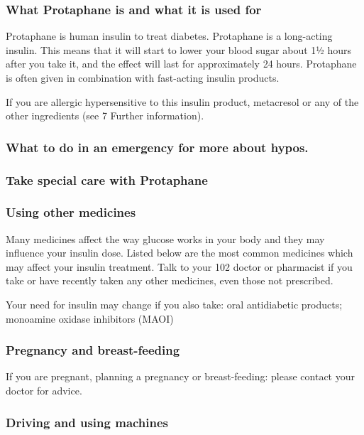 \documentclass[output=paper]{langsci/langscibook}
\begin{document}
\subsubsection*{What Protaphane is and what it is used for}

Protaphane is human insulin to treat diabetes. Protaphane is a long-acting insulin. This means that it will start to lower your blood sugar about 1½ hours after you take it, and the effect will last for approximately 24 hours. Protaphane is often given in combination with fast-acting insulin products.

If you are allergic hypersensitive to this insulin product, metacresol or any of the other ingredients (see 7 Further information). 

\subsubsection*{What to do in an emergency for more about hypos.}

\subsubsection*{Take special care with Protaphane}

\subsubsection*{Using other medicines}

Many medicines affect the way glucose works in your body and they may influence your insulin dose. Listed below are the most common medicines which may affect your insulin treatment. Talk to your 102 doctor or pharmacist if you take or have recently taken any other medicines, even those not prescribed. 

Your need for insulin may change if you also take: oral antidiabetic products; monoamine oxidase inhibitors (MAOI)

\subsubsection*{Pregnancy and breast-feeding}

If you are pregnant, planning a pregnancy or breast-feeding: please contact your doctor for advice.

\subsubsection*{Driving and using machines}
\end{document}
